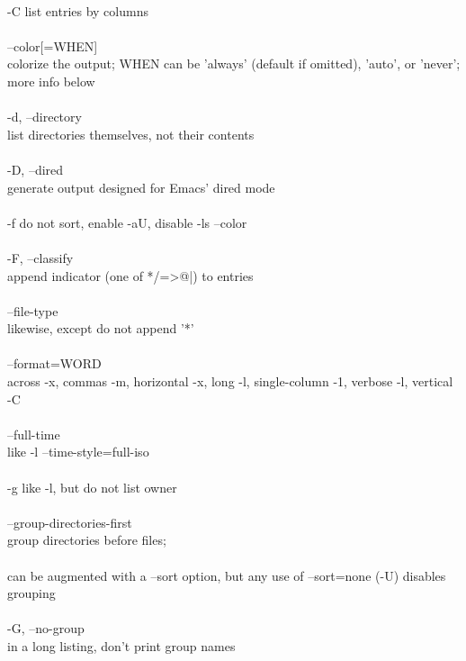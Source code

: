 \documentclass{article}
\begin{document}
\\
       -C     list entries by columns \\
\\
       --color[=WHEN] \\
              colorize  the output; WHEN can be 'always' (default if omitted),
              'auto', or 'never'; more info below \\
\\
       -d, --directory \\
              list directories themselves, not their contents \\
\\
       -D, --dired \\
              generate output designed for Emacs' dired mode \\
\\
       -f     do not sort, enable -aU, disable -ls --color \\
\\
       -F, --classify \\
              append indicator (one of */=>@|) to entries \\
\\
       --file-type \\
              likewise, except do not append '*' \\
\\
       --format=WORD \\
              across -x, commas -m, horizontal -x, long -l, single-column  -1,
              verbose -l, vertical -C \\
\\
       --full-time \\
              like -l --time-style=full-iso \\
\\
       -g     like -l, but do not list owner \\
\\
       --group-directories-first \\
              group directories before files; \\
\\
              can   be  augmented  with  a  --sort  option,  but  any  use  of
              --sort=none (-U) disables grouping \\
\\
       -G, --no-group \\
              in a long listing, don't print group names \\
\\
\end{document}
